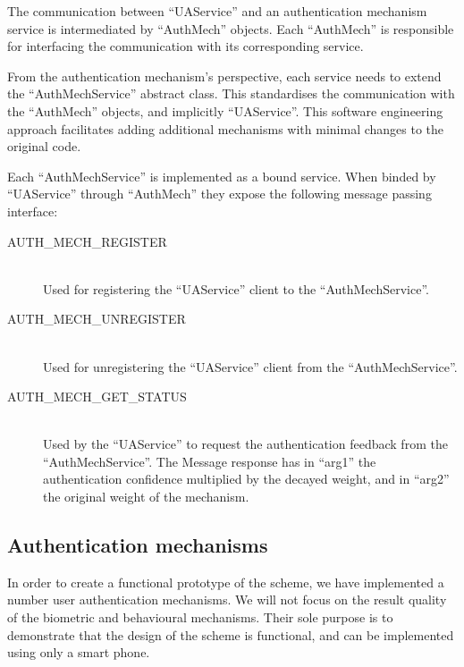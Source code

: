 The communication between ``UAService'' and an authentication mechanism service is intermediated by ``AuthMech'' objects. Each ``AuthMech'' is responsible for interfacing the communication with its corresponding service. 

From the authentication mechanism's perspective, each service needs to extend the ``AuthMechService'' abstract class. This standardises the communication with the ``AuthMech'' objects, and implicitly ``UAService''. This software engineering approach facilitates adding additional mechanisms with minimal changes to the original code.

Each ``AuthMechService'' is implemented as a bound service. When binded by ``UAService'' through ``AuthMech'' they expose the following message passing interface:
\begin{description}
  \item[AUTH\_MECH\_REGISTER] \hfill \\
  Used for registering the ``UAService'' client to the ``AuthMechService''.
  
  \item[AUTH\_MECH\_UNREGISTER] \hfill \\
  Used for unregistering the ``UAService'' client from the ``AuthMechService''.
  
  \item[AUTH\_MECH\_GET\_STATUS] \hfill \\
  Used by the ``UAService'' to request the authentication feedback from the ``AuthMechService''. The Message response has in ``arg1'' the authentication confidence multiplied by the decayed weight, and in ``arg2'' the original weight of the mechanism.
  \end{description}

\subsection{Authentication mechanisms}
\label{implauthmech}
In order to create a functional prototype of the scheme, we have implemented a number user authentication mechanisms. We will not focus on the result quality of the biometric and behavioural mechanisms. Their sole purpose is to demonstrate that the design of the scheme is functional, and can be implemented using only a smart phone.

